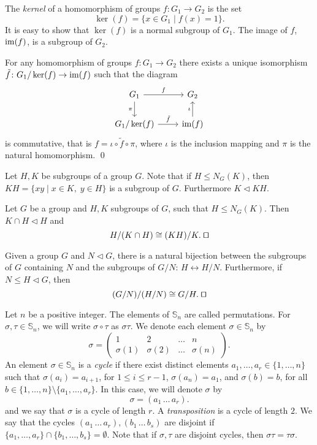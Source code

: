The {\em kernel} of a homomorphism of groups $f\colon G_1\rightarrow G_2$ is the set
$$\ker (f)=\{ x\in G_1\mid f(x)=1\}.$$
It is easy to show that $\ker(f)$ is a normal subgroup of $G_1$. The image of $f$, $\operatorname{im}(f)$, is a subgroup of $G_2$.

\begin{theorem}
	For any homomorphism of groups $f\colon G_1\rightarrow G_2$ there exists a unique isomorphism $\tilde f\colon G_1/\ker(f)\rightarrow\operatorname{im}(f)$ such that the diagram
	\[\begin{tikzcd}
		{G_1} & {G_2} \\
		{G_1/\ker(f)} & {\im(f)}
		\arrow["f", from=1-1, to=1-2]
		\arrow["{\pi}"', from=1-1, to=2-1]
		\arrow["{\iota}", from=2-2, to=1-2]
		\arrow["{\tilde f}", from=2-1, to=2-2]
	\end{tikzcd}
	\]
	is commutative, that is $f=\iota\circ \tilde f\circ\pi$, where $\iota$ is the inclusion mapping and $\pi$ is the natural homomorphism. \qed	
	\end{theorem} 
 
Let $H,K$ be subgroups of a group $G$. Note that if $H\leq N_G(K)$, then $KH=\{xy\mid x\in K,\; y\in H\}$ is a subgroup of $G$. Furthermore $K\lhd KH$.

\begin{theorem}
	Let $G$ be a group and $H,K$ subgroups of $G$, such that $H\leq N_G(K)$. Then $K\cap H\lhd H$ and
	$$H/(K\cap H)\cong (KH)/K.\;\qed$$  
\end{theorem}

\begin{theorem} Given a group $G$ and $N\lhd G$, there is a natural bijection between the subgroups of $G$ containing $N$ and the subgroups of $G/N$: $H\leftrightarrow H/N$. Furthermore, if $N\leq H\lhd G$, then
	$$(G/N)/(H/N)\cong G/H.\; \qed$$ 
	\end{theorem}

Let $n$ be a positive integer. The elements of $\mathbb{S}_n$ are called permutations. For $\sigma,\tau\in\mathbb{S}_n$, 
we will write $\sigma\circ\tau$ as $\sigma\tau$. 
We denote each element $\sigma\in\mathbb{S}_n$ by
\[ \sigma=\left(\begin{array}{cccc}
1&2&\ldots&n\\
\sigma(1)&\sigma(2)&\ldots&\sigma(n)\end{array}\right).\]
An element $\sigma\in \mathbb{S}_n$ is a {\em cycle} if there exist distinct elements 
$a_1,\dots ,a_r\in\{ 1,\dots, n\}$ such that $\sigma(a_i)=a_{i+1}$, for $1\leq i\leq r-1$, $\sigma(a_n)=a_1$, and $\sigma(b)=b$, 
for all $b\in \{1,\dots , n\}\setminus\{ a_1,\dots ,a_r\}$. In this case, we will denote $\sigma$ by
\[ \sigma=(a_1\,\dots\, a_r).\]
and we say that $\sigma$ is a cycle of length $r$. A {\em transposition} is a cycle of length $2$. We say that the cycles
$(a_1\,\dots\, a_r),(b_1\,\dots\, b_s)$ are disjoint if $\{ a_1,\dots, a_r\}\cap \{ b_1,\dots, b_s\}=\emptyset$. 
Note that if $\sigma,\tau$ are disjoint cycles, then $\sigma\tau=\tau\sigma$.


